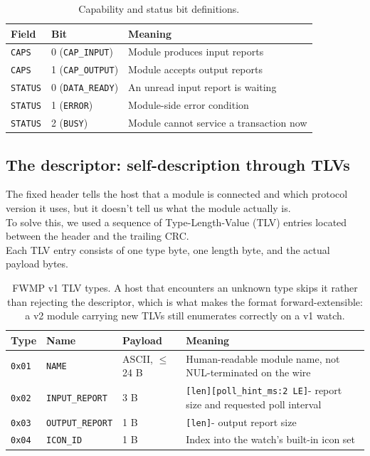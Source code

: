 \documentclass[12pt, a4paper]{article}
\begin{document}
\begin{table}[H]
\centering
\small
\begin{tabular}{@{}l l l@{}}
\toprule
\textbf{Field} & \textbf{Bit} & \textbf{Meaning} \\
\midrule
\texttt{CAPS} & 0 (\texttt{CAP\_INPUT})  & Module produces input reports \\
\texttt{CAPS} & 1 (\texttt{CAP\_OUTPUT}) & Module accepts output reports \\
\texttt{STATUS} & 0 (\texttt{DATA\_READY}) & An unread input report is waiting \\
\texttt{STATUS} & 1 (\texttt{ERROR})       & Module-side error condition \\
\texttt{STATUS} & 2 (\texttt{BUSY})        & Module cannot service a transaction now \\
\bottomrule
\end{tabular}
\caption{Capability and status bit definitions.}
\label{tab:caps}
\end{table}

\subsection{The descriptor: self-description through TLVs}

The fixed header tells the host that a module is connected and which protocol version it uses, but it doesn't tell us what the module actually is. \\
To solve this, we used a sequence of Type-Length-Value (TLV) entries located between the header and the trailing CRC. \\
Each TLV entry consists of one type byte, one length byte, and the actual payload bytes.

\begin{table}[H]
\centering
\small
\begin{tabular}{@{}l l l p{7cm}@{}}
\toprule
\textbf{Type} & \textbf{Name} & \textbf{Payload} & \textbf{Meaning} \\
\midrule
\texttt{0x01} & \texttt{NAME} & ASCII, $\le$ 24 B & Human-readable module name, not NUL-terminated on the wire \\
\texttt{0x02} & \texttt{INPUT\_REPORT} & 3 B & \texttt{[len][poll\_hint\_ms:2 LE]}- report size and requested poll interval \\
\texttt{0x03} & \texttt{OUTPUT\_REPORT} & 1 B & \texttt{[len]}- output report size \\
\texttt{0x04} & \texttt{ICON\_ID} & 1 B & Index into the watch's built-in icon set \\
\bottomrule
\end{tabular}
\caption{FWMP v1 TLV types. A host that encounters an unknown type skips it rather than rejecting the descriptor, which is what makes the format forward-extensible: a v2 module carrying new TLVs still enumerates correctly on a v1 watch.}
\label{tab:tlv}
\end{table}
\end{document}
